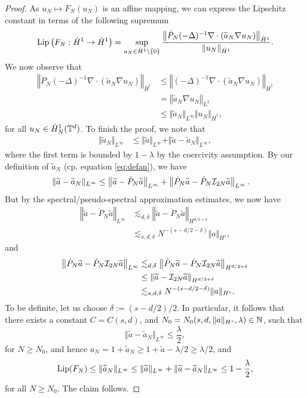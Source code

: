 \documentclass[reqno,a4paper]{amsart}
\begin{document}
\begin{proof}
As $u_N \mapsto F_N(u_N)$ is an affine mapping, we can express the Lipschitz constant in terms of the following supremum
\[
\mathrm{Lip}\left(F_N: \dot{H}^1 \to \dot{H}^1 \right) 
=
\sup_{u_N\in \dot{H}^1\setminus\{0\}} 
\frac{
\left\Vert 
\dot{P}_N (-\Delta)^{-1} \nabla \cdot (\widetilde{a}_N \nabla u_N) 
\right\Vert_{\dot{H}^1}
}
{
\Vert u_N \Vert_{\dot{H}^1}
}.
\]
We now observe that
\begin{align*}
\left\Vert 
\dot{P}_N (-\Delta)^{-1} \nabla \cdot (\tilde{a}_N \nabla u_N) 
\right\Vert_{\dot{H}^1}
&\le
\left\Vert 
(-\Delta)^{-1} \nabla \cdot (\tilde{a}_N \nabla u_N) 
\right\Vert_{\dot{H}^1}
\\
&=
\left\Vert 
\tilde{a}_N \nabla u_N
\right\Vert_{L^2}
\\
&\le
\Vert \tilde{a}_N \Vert_{L^\infty}
\Vert u_N\Vert_{\dot{H}^1},
\end{align*}
for all $u_N \in \dot{H}^1_N(\mathbb{T}^d)$. To finish the proof, we note that 
\begin{align*}
\Vert \tilde{a}_N \Vert_{L^\infty}
&\le
\Vert \tilde{a} \Vert_{L^\infty}
+
\Vert \tilde{a} - \tilde{a}_N \Vert_{L^\infty},
\end{align*}
where the first term is bounded by $1-\lambda$ by the coercivity assumption. By our definition of $\tilde{a}_N$ (cp. equation \eqref{eq:defan}), we have
\begin{align*}
\Vert \widetilde{a} - \widetilde{a}_N \Vert_{L^\infty}
&\le
\left\Vert \widetilde{a} - \dot{P}_N\widetilde{a} \right\Vert_{L^\infty}
+
\left\Vert \dot{P}_N\widetilde{a} - \dot{P}_N\mathcal{I}_{2N}\widetilde{a} \right\Vert_{L^\infty}.
\end{align*}
But by the spectral/pseudo-spectral approximation estimates, we now have 
\begin{align*}
\left\Vert \tilde{a} - \dot{P}_N\tilde{a} \right\Vert_{L^\infty}
&\lesssim_{d,\delta} \left\Vert \tilde{a} - \dot{P}_N\tilde{a} \right\Vert_{H^{d/2+\delta}}
\\
&\lesssim_{s,d,\delta} N^{-(s-d/2-\delta)} \Vert a \Vert_{H^s}, 
\end{align*}
and
\begin{align*}
\left\Vert \dot{P}_N\widetilde{a} - \dot{P}_N\mathcal{I}_{2N}\widetilde{a} \right\Vert_{L^\infty}
&\lesssim_{d,\delta} \left\Vert \dot{P}_N\widetilde{a} - \dot{P}_N\mathcal{I}_{2N}\widetilde{a} \right\Vert_{H^{d/2+\delta}}
\\
&\le \left\Vert \widetilde{a} - \mathcal{I}_{2N}\widetilde{a} \right\Vert_{H^{d/2+\delta}}
\\
&\lesssim_{s,d,\delta} N^{-(s-d/2-\delta)} \Vert a \Vert_{H^s}.
\end{align*}
To be definite, let us choose $\delta := (s-d/2)/2$. In particular, it follows that there exists a constant $C = C(s,d)$, and $N_0 = N_0(s,d,\Vert a \Vert_{H^s},\lambda)\in \mathbb{N}$, such that 
\[
\Vert \tilde{a} - \tilde{a}_N \Vert_{L^\infty} \le \frac{\lambda}{2},
\]
for $N \ge N_0$, and hence $a_N = 1+\tilde{a}_N \ge 1 + \tilde{a} - \lambda/2 \ge \lambda/2$, and
\[
\mathrm{Lip}(F_N) 
\le \Vert \widetilde{a}_N \Vert_{L^\infty} 
\le \Vert \widetilde{a} \Vert_{L^\infty} + \Vert \widetilde{a} - \widetilde{a}_N \Vert_{L^\infty}  
\le 1-\frac{\lambda}{2},
\]
for all $N \ge N_0$. The claim follows.
\end{proof}
\end{document}
